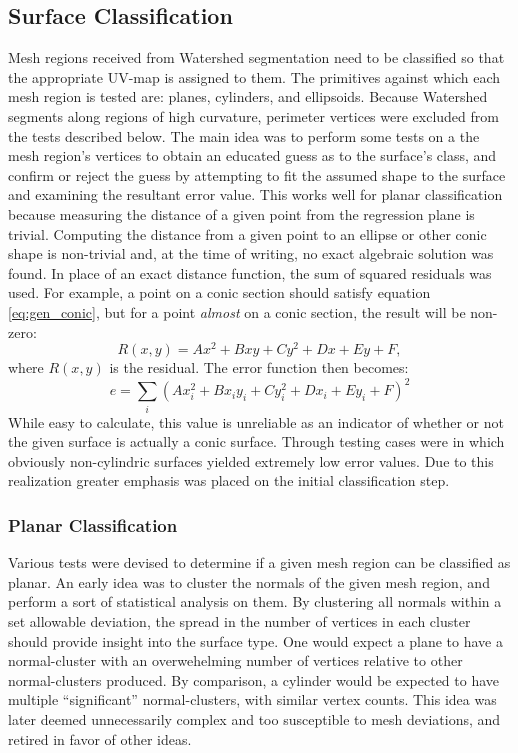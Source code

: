 \subsection{Surface Classification}
Mesh regions received from Watershed segmentation need to be classified so that the appropriate UV-map is assigned to them.
The primitives against which each mesh region is tested are: planes, cylinders, and ellipsoids.
Because Watershed segments along regions of high curvature, perimeter vertices were excluded from the tests described below.
The main idea was to perform some tests on a the mesh region's vertices to obtain an educated guess as to the surface's class, and confirm or reject the guess by attempting to fit the assumed shape to the surface and examining the resultant error value.
This works well for planar classification because measuring the distance of a given point from the regression plane is trivial.
Computing the distance from a given point to an ellipse or other conic shape is non-trivial and, at the time of writing, no exact algebraic solution was found.
In place of an exact distance function, the sum of squared residuals was used.
For example, a point on a conic section should satisfy equation \ref{eq:gen_conic}, but for a point \textit{almost} on a conic section, the result will be non-zero:
\begin{equation}
	R(x,y) = Ax^2 + Bxy + Cy^2 + Dx + Ey + F,
\end{equation}
where $R(x,y)$ is the residual. The error function then becomes:
\begin{equation}
	e = \sum_i \left(Ax_i^2 + Bx_i y_i + Cy_i^2 + Dx_i + Ey_i + F\right)^2
\end{equation}
While easy to calculate, this value is unreliable as an indicator of whether or not the given surface is actually a conic surface.
Through testing cases were in which obviously non-cylindric surfaces yielded extremely low error values.
Due to this realization greater emphasis was placed on the initial classification step.

\subsubsection{Planar Classification}
Various tests were devised to determine if a given mesh region can be classified as planar.
An early idea was to cluster the normals of the given mesh region, and perform a sort of statistical analysis on them.
By clustering all normals within a set allowable deviation, the spread in the number of vertices in each cluster should provide insight into the surface type.
One would expect a plane to have a normal-cluster with an overwehelming number of vertices relative to other normal-clusters produced.
By comparison, a cylinder would be expected to have multiple ``significant'' normal-clusters, with similar vertex counts.
This idea was later deemed unnecessarily complex and too susceptible to mesh deviations, and retired in favor of other ideas.


